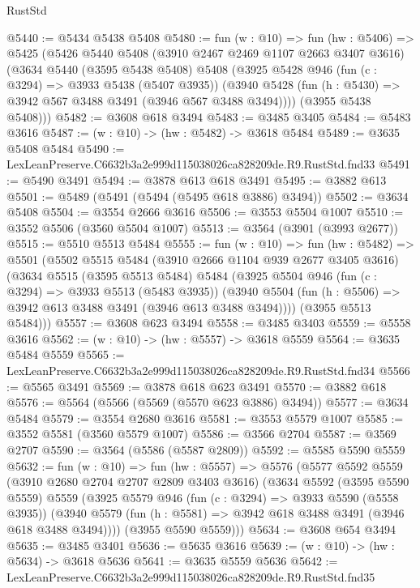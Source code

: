 \begin{lexlean}{RustStd}
\begin{coremodule}
@5440 := @5434 @5438 @5408
@5480 := fun (w : @10) =>
  fun (hw : @5406) =>
  @5425
    (@5426
      @5440
      @5408
      (@3910 @2467 @2469 @1107 @2663 @3407 @3616)
      (@3634
        @5440
        (@3595 @5438 @5408)
        @5408
        (@3925
          @5428
          @946
          (fun (c : @3294) => @3933 @5438 (@5407 @3935))
          (@3940 @5428 (fun (h : @5430) => @3942 @567 @3488 @3491 (@3946 @567 @3488 @3494))))
        (@3955 @5438 @5408)))
@5482 := @3608 @618 @3494
@5483 := @3485 @3405
@5484 := @5483 @3616
@5487 := (w : @10) -> (hw : @5482) -> @3618 @5484
@5489 := @3635 @5408 @5484
@5490 := LexLeanPreserve.C6632b3a2e999d115038026ca828209de.R9.RustStd.fnd33
@5491 := @5490 @3491
@5494 := @3878 @613 @618 @3491
@5495 := @3882 @613
@5501 := @5489 (@5491 (@5494 (@5495 @618 @3886) @3494))
@5502 := @3634 @5408
@5504 := @3554 @2666 @3616
@5506 := @3553 @5504 @1007
@5510 := @3552 @5506 (@3560 @5504 @1007)
@5513 := @3564 (@3901 (@3993 @2677))
@5515 := @5510 @5513 @5484
@5555 := fun (w : @10) =>
  fun (hw : @5482) =>
  @5501
    (@5502
      @5515
      @5484
      (@3910 @2666 @1104 @939 @2677 @3405 @3616)
      (@3634
        @5515
        (@3595 @5513 @5484)
        @5484
        (@3925
          @5504
          @946
          (fun (c : @3294) => @3933 @5513 (@5483 @3935))
          (@3940 @5504 (fun (h : @5506) => @3942 @613 @3488 @3491 (@3946 @613 @3488 @3494))))
        (@3955 @5513 @5484)))
@5557 := @3608 @623 @3494
@5558 := @3485 @3403
@5559 := @5558 @3616
@5562 := (w : @10) -> (hw : @5557) -> @3618 @5559
@5564 := @3635 @5484 @5559
@5565 := LexLeanPreserve.C6632b3a2e999d115038026ca828209de.R9.RustStd.fnd34
@5566 := @5565 @3491
@5569 := @3878 @618 @623 @3491
@5570 := @3882 @618
@5576 := @5564 (@5566 (@5569 (@5570 @623 @3886) @3494))
@5577 := @3634 @5484
@5579 := @3554 @2680 @3616
@5581 := @3553 @5579 @1007
@5585 := @3552 @5581 (@3560 @5579 @1007)
@5586 := @3566 @2704
@5587 := @3569 @2707
@5590 := @3564 (@5586 (@5587 @2809))
@5592 := @5585 @5590 @5559
@5632 := fun (w : @10) =>
  fun (hw : @5557) =>
  @5576
    (@5577
      @5592
      @5559
      (@3910 @2680 @2704 @2707 @2809 @3403 @3616)
      (@3634
        @5592
        (@3595 @5590 @5559)
        @5559
        (@3925
          @5579
          @946
          (fun (c : @3294) => @3933 @5590 (@5558 @3935))
          (@3940 @5579 (fun (h : @5581) => @3942 @618 @3488 @3491 (@3946 @618 @3488 @3494))))
        (@3955 @5590 @5559)))
@5634 := @3608 @654 @3494
@5635 := @3485 @3401
@5636 := @5635 @3616
@5639 := (w : @10) -> (hw : @5634) -> @3618 @5636
@5641 := @3635 @5559 @5636
@5642 := LexLeanPreserve.C6632b3a2e999d115038026ca828209de.R9.RustStd.fnd35

\end{coremodule}
\end{lexlean}
